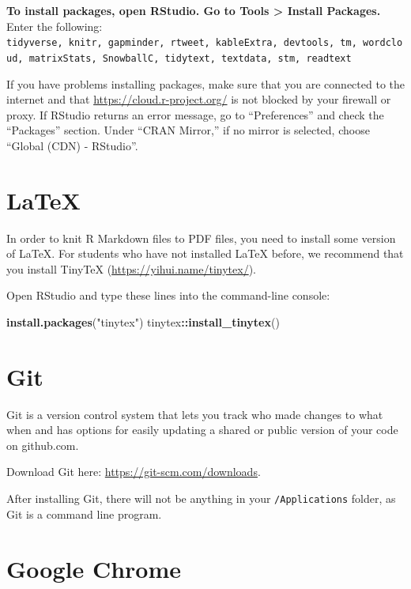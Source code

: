 \documentclass[]{book}
\newenvironment{Shaded}{\begin{snugshade}}{\end{snugshade}}
\newcommand{\KeywordTok}[1]{\textcolor[rgb]{0.13,0.29,0.53}{\textbf{#1}}}
\newcommand{\StringTok}[1]{\textcolor[rgb]{0.31,0.60,0.02}{#1}}
\newcommand{\OperatorTok}[1]{\textcolor[rgb]{0.81,0.36,0.00}{\textbf{#1}}}
\newcommand{\NormalTok}[1]{#1}
\begin{document}
\textbf{To install packages, open RStudio. Go to Tools \textgreater{}
Install Packages.} Enter the following:
\texttt{tidyverse,\ knitr,\ gapminder,\ rtweet,\ kableExtra,\ devtools,\ tm,\ wordcloud,\ matrixStats,\ SnowballC,\ tidytext,\ textdata,\ stm,\ readtext}

If you have problems installing packages, make sure that you are
connected to the internet and that \url{https://cloud.r-project.org/} is
not blocked by your firewall or proxy. If RStudio returns an error
message, go to ``Preferences'' and check the ``Packages'' section. Under
``CRAN Mirror,'' if no mirror is selected, choose ``Global (CDN) -
RStudio''.

\section{LaTeX}\label{latex}

In order to knit R Markdown files to PDF files, you need to install some
version of LaTeX. For students who have not installed LaTeX before, we
recommend that you install TinyTeX (\url{https://yihui.name/tinytex/}).

Open RStudio and type these lines into the command-line console:

\begin{Shaded}
\begin{Highlighting}[]
\KeywordTok{install.packages}\NormalTok{(}\StringTok{"tinytex"}\NormalTok{)}
\NormalTok{tinytex}\OperatorTok{::}\KeywordTok{install_tinytex}\NormalTok{() }
\end{Highlighting}
\end{Shaded}

\section{Git}\label{git}

Git is a version control system that lets you track who made changes to
what when and has options for easily updating a shared or public version
of your code on github.com.

Download Git here: \url{https://git-scm.com/downloads}.

After installing Git, there will not be anything in your
\texttt{/Applications} folder, as Git is a command line program.

\section{Google Chrome}\label{google-chrome}
\end{document}
